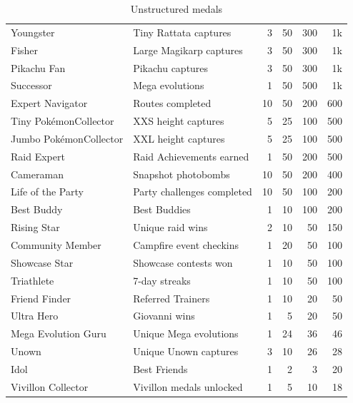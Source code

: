 \begin{table}[th]
\begin{tabular}{p{}p{}rrrr}
Youngster & Tiny Rattata captures & 3 & 50 & 300 & 1k\\
Fisher & Large Magikarp captures & 3 & 50 & 300 & 1k\\
Pikachu Fan & Pikachu captures & 3 & 50 & 300 & 1k\\
Successor & Mega evolutions & 1 & 50 & 500 & 1k\\
Expert Navigator & Routes completed & 10 & 50 & 200 & 600\\
Tiny Pokémon\newline{}Collector & XXS height captures & 5 & 25 & 100 & 500\\
Jumbo Pokémon\newline{}Collector & XXL height captures & 5 & 25 & 100 & 500\\
Raid Expert & Raid Achievements earned & 1 & 50 & 200 & 500\\
Cameraman & Snapshot photobombs & 10 & 50 & 200 & 400\\
Life of the Party & Party challenges completed & 10 & 50 & 100 & 200\\
Best Buddy & Best Buddies & 1 & 10 & 100 & 200\\
Rising Star & Unique raid wins & 2 & 10 & 50 & 150\\
Community Member & Campfire event checkins & 1 & 20 & 50 & 100\\
Showcase Star & Showcase contests won & 1 & 10 & 50 & 100\\
Triathlete & 7-day streaks & 1 & 10 & 50 & 100\\
Friend Finder & Referred Trainers & 1 & 10 & 20 & 50\\
Ultra Hero & Giovanni wins & 1 & 5 & 20 & 50\\
Mega Evolution Guru & Unique Mega evolutions & 1 & 24 & 36 & 46\\
Unown & Unique Unown captures & 3 & 10 & 26 & 28\\
Idol & Best Friends & 1 & 2 & 3 & 20\\
Vivillon Collector & Vivillon medals unlocked & 1 & 5 & 10 & 18\\
\end{tabular}\caption{Unstructured medals\label{table:medals}}\end{table}
%
